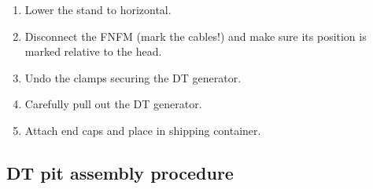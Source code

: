 \begin{enumerate}
\item \CheckBox[name=dtpdp17]{} Lower the stand to horizontal.
\item \CheckBox[name=dtpdp18]{} Disconnect the FNFM (mark the cables!) and make sure its position is marked relative to the head.
\item \CheckBox[name=dtpdp19]{} Undo the clamps securing the DT generator.
\item \CheckBox[name=dtpdp20]{} Carefully pull out the DT generator.
\item \CheckBox[name=dtpdp21]{} Attach end caps and place in shipping container.
\end{enumerate}

\subsection{ DT pit assembly procedure}

